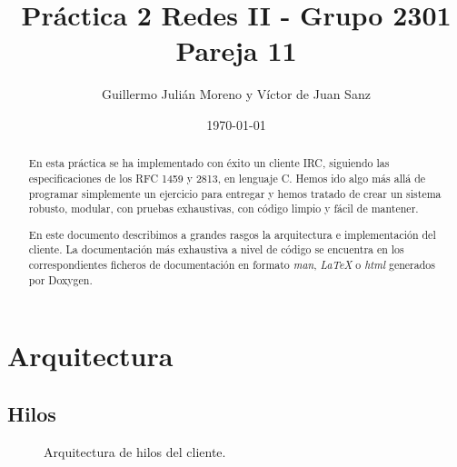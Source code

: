 \documentclass{article}
\title{Práctica 2 Redes II - Grupo 2301 Pareja 11}
\author{Guillermo Julián Moreno y Víctor de Juan Sanz}
\date{\today}
\begin{document}
\maketitle

\begin{abstract}
En esta práctica se ha implementado con éxito un cliente IRC, siguiendo las especificaciones de los RFC 1459 y 2813, en lenguaje C. Hemos ido algo más allá de programar simplemente un ejercicio para entregar y hemos tratado de crear un sistema robusto, modular, con pruebas exhaustivas, con código limpio y fácil de mantener.

En este documento describimos a grandes rasgos la arquitectura e implementación del cliente. La documentación más exhaustiva a nivel de código se encuentra en los correspondientes ficheros de documentación en formato \textit{man}, \textit{\LaTeX} o \textit{html} generados por Doxygen.
\end{abstract}

\section{Arquitectura}

\subsection{Hilos}

\begin{figure}[hbtp]
\centering
{}
\caption{Arquitectura de hilos del cliente.}
\label{imgHilos}
\end{figure}
\end{document}
